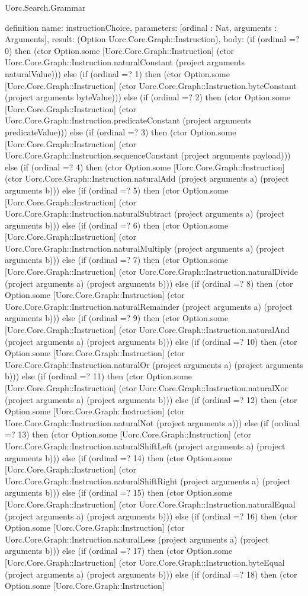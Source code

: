 \begin{lexlean}{Uorc.Search.Grammar}
\begin{semanticmodule}
definition{
  name: instructionChoice,
  parameters: [ordinal : Nat, arguments : Arguments],
  result: (Option Uorc.Core.Graph::Instruction),
  body: (if (ordinal =? 0) then (ctor Option.some [Uorc.Core.Graph::Instruction] (ctor Uorc.Core.Graph::Instruction.naturalConstant (project arguments naturalValue))) else (if (ordinal =? 1) then (ctor Option.some [Uorc.Core.Graph::Instruction] (ctor Uorc.Core.Graph::Instruction.byteConstant (project arguments byteValue))) else (if (ordinal =? 2) then (ctor Option.some [Uorc.Core.Graph::Instruction] (ctor Uorc.Core.Graph::Instruction.predicateConstant (project arguments predicateValue))) else (if (ordinal =? 3) then (ctor Option.some [Uorc.Core.Graph::Instruction] (ctor Uorc.Core.Graph::Instruction.sequenceConstant (project arguments payload))) else (if (ordinal =? 4) then (ctor Option.some [Uorc.Core.Graph::Instruction] (ctor Uorc.Core.Graph::Instruction.naturalAdd (project arguments a) (project arguments b))) else (if (ordinal =? 5) then (ctor Option.some [Uorc.Core.Graph::Instruction] (ctor Uorc.Core.Graph::Instruction.naturalSubtract (project arguments a) (project arguments b))) else (if (ordinal =? 6) then (ctor Option.some [Uorc.Core.Graph::Instruction] (ctor Uorc.Core.Graph::Instruction.naturalMultiply (project arguments a) (project arguments b))) else (if (ordinal =? 7) then (ctor Option.some [Uorc.Core.Graph::Instruction] (ctor Uorc.Core.Graph::Instruction.naturalDivide (project arguments a) (project arguments b))) else (if (ordinal =? 8) then (ctor Option.some [Uorc.Core.Graph::Instruction] (ctor Uorc.Core.Graph::Instruction.naturalRemainder (project arguments a) (project arguments b))) else (if (ordinal =? 9) then (ctor Option.some [Uorc.Core.Graph::Instruction] (ctor Uorc.Core.Graph::Instruction.naturalAnd (project arguments a) (project arguments b))) else (if (ordinal =? 10) then (ctor Option.some [Uorc.Core.Graph::Instruction] (ctor Uorc.Core.Graph::Instruction.naturalOr (project arguments a) (project arguments b))) else (if (ordinal =? 11) then (ctor Option.some [Uorc.Core.Graph::Instruction] (ctor Uorc.Core.Graph::Instruction.naturalXor (project arguments a) (project arguments b))) else (if (ordinal =? 12) then (ctor Option.some [Uorc.Core.Graph::Instruction] (ctor Uorc.Core.Graph::Instruction.naturalNot (project arguments a))) else (if (ordinal =? 13) then (ctor Option.some [Uorc.Core.Graph::Instruction] (ctor Uorc.Core.Graph::Instruction.naturalShiftLeft (project arguments a) (project arguments b))) else (if (ordinal =? 14) then (ctor Option.some [Uorc.Core.Graph::Instruction] (ctor Uorc.Core.Graph::Instruction.naturalShiftRight (project arguments a) (project arguments b))) else (if (ordinal =? 15) then (ctor Option.some [Uorc.Core.Graph::Instruction] (ctor Uorc.Core.Graph::Instruction.naturalEqual (project arguments a) (project arguments b))) else (if (ordinal =? 16) then (ctor Option.some [Uorc.Core.Graph::Instruction] (ctor Uorc.Core.Graph::Instruction.naturalLess (project arguments a) (project arguments b))) else (if (ordinal =? 17) then (ctor Option.some [Uorc.Core.Graph::Instruction] (ctor Uorc.Core.Graph::Instruction.byteEqual (project arguments a) (project arguments b))) else (if (ordinal =? 18) then (ctor Option.some [Uorc.Core.Graph::Instruction] }
\end{semanticmodule}
\end{lexlean}
